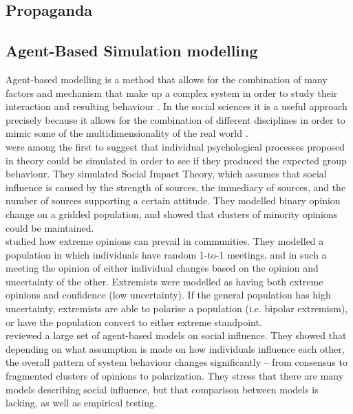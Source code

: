 \subsection{Propaganda} 

\subsection{Agent-Based Simulation modelling}
Agent-based modelling is a method that allows for the combination of many factors and mechanism that make up a complex system in order to study their interaction and resulting behaviour \citep{Flache2017}.  In the social sciences it is a useful approach precisely because it allows for the combination of different disciplines in order to mimic some of the multidimensionality of the real world \citep{Epstein2006}. \\

\cite{Nowak1990} were among the first to suggest that individual psychological processes proposed in theory could be simulated in order to see if they produced the expected group behaviour. They simulated Social Impact Theory, which assumes that social influence is caused by the strength of sources, the immediacy of sources, and the number of sources supporting a certain attitude. They modelled binary opinion change on a gridded population, and showed that clusters of minority opinions could be maintained. \\

\cite{Deffuant2002} studied how extreme opinions can prevail in communities. They modelled a population in which individuals have random 1-to-1 meetings, and in such a meeting the opinion of either individual changes based on the opinion and uncertainty of the other. Extremists were modelled as having both extreme opinions and confidence (low uncertainty). If the general population has high uncertainty, extremists are able to polarise a population (i.e. bipolar extremism), or have the population convert to either extreme standpoint. \\

\cite{Flache2017} reviewed a large set of agent-based models on social influence. They showed that depending on what assumption is made on how individuals influence each other, the overall pattern of system behaviour changes significantly – from consensus to fragmented clusters of opinions to polarization. They stress that there are many models describing social influence, but that comparison between models is lacking, as well as empirical testing. \\

